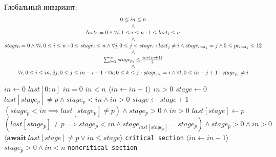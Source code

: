 \documentclass{article}
\begin{document}
Глобальный инвариант:
\begin{displaymath}
\begin{matrix}
    0 \leq in \leq n \\
    \land \\
    last_0 = 0 \land \forall i, 1 \leq i \leq n : 1 \leq last_i \leq n \\
    \land \\
    stage_0 = 0 \land \forall i, 0 \leq i \leq n : 0 \leq stage_i \leq n \land \forall j, 0 \leq j < stage_i : last_j \neq i \land stage_{last_j} = j \land 5 \leq pc_{last_j} \leq 12 \\
    \land \\
    \sum_{i = 1}^{in} stage_{p_i} \leq {in * (in + 1) \over 2} \\
    \land \\
    \forall i, 0 \leq i \leq in, \exists j, 0 \leq j \leq in - i + 1 : \forall k, 0 \leq k \leq j : stage_{p_k} = i \land \forall l, 0 \leq in - j + 1 : stage_{p_l} \neq i
\end{matrix}
\end{displaymath}

\begin{algorithmic}[1]
\State $ in \gets 0 $
\State $ last[0:n] $                                                                            \Comment $ in = 0 $
                                                                   \Comment $ in < n $
        \State $ \langle in \gets in + 1 \rangle $                                              \Comment $ in > 0 $
        \State $ stage \gets 0 $                                                                \Comment $ last[stage_p] \neq p \land stage_p < in \land in > 0 $
            \State $ stage \gets stage + 1 $                                                    \Comment $ (stage_p < in \implies last[stage_p] \neq p) \land stage_p > 0 \land in > 0 $
            \State $ last[stage] \gets p $                                                      \Comment $ (last[stage_p] \neq p \implies stage_p < in \land stage_{last[stage_p]} = stage_p) \land stage_p > 0 \land in > 0 $
            \State $ \langle \textbf{await}\ last[stage] \neq p \lor in \leq stage \rangle $
        \EndWhile
        \State \texttt{critical section}
        \State $ \langle in \gets in - 1 \rangle $                                              \Comment $ stage_p > 0 \land in < n $
        \State \texttt{noncritical section}
    \EndWhile
\EndProcedure
\end{algorithmic}
\end{document}
